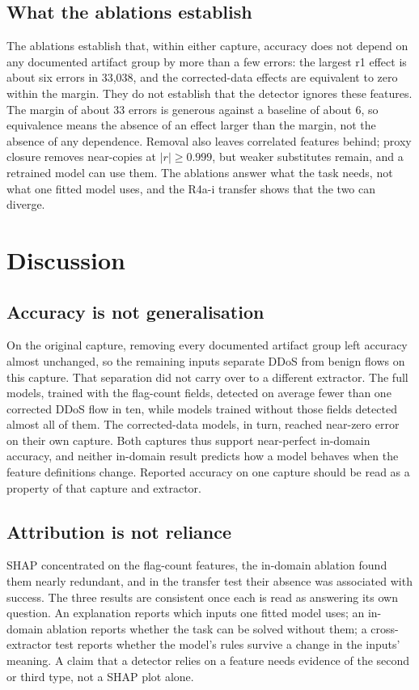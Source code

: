 \documentclass[journal]{IEEEtran}
\begin{document}
\subsection{What the ablations establish}
The ablations establish that, within either capture, accuracy does not depend on any documented
artifact group by more than a few errors: the largest r1 effect is about six errors in 33,038, and
the corrected-data effects are equivalent to zero within the margin. They do not establish that the
detector ignores these features. The margin of about 33 errors is generous against a baseline of
about 6, so equivalence means the absence of an effect larger than the margin, not the absence of
any dependence. Removal also leaves correlated features behind; proxy closure removes near-copies
at $|r|\ge0.999$, but weaker substitutes remain, and a retrained model can use them. The ablations
answer what the task needs, not what one fitted model uses, and the R4a-i transfer shows that the
two can diverge. %

\section{Discussion}
\label{sec:discussion}

\subsection{Accuracy is not generalisation}
On the original capture, removing every documented artifact group left accuracy almost unchanged,
so the remaining inputs separate DDoS from benign flows on this capture. That separation did not
carry over to a different extractor. The full models, trained with the flag-count fields, detected
on average fewer than one corrected DDoS flow in ten, while models trained without those fields
detected almost all of them. %
The corrected-data models, in turn, reached near-zero error on their
own capture. Both captures thus support near-perfect in-domain accuracy, and neither in-domain
result predicts how a model behaves when the feature definitions change. Reported accuracy on one
capture should be read as a property of that capture and extractor.

\subsection{Attribution is not reliance}
SHAP concentrated on the flag-count features, the in-domain ablation found them nearly redundant,
and in the transfer test their absence was associated with success. The three results are consistent once each is read as
answering its own question. An explanation reports which inputs one fitted model uses; an in-domain
ablation reports whether the task can be solved without them; a cross-extractor test reports whether
the model's rules survive a change in the inputs' meaning. A claim that a detector relies on a
feature needs evidence of the second or third type, not a SHAP plot alone.
\end{document}
